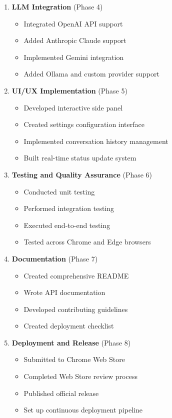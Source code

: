\documentclass[12pt,a4paper]{article}
\begin{document}
\begin{enumerate}
    \item \textbf{LLM Integration} (Phase 4)
    \begin{itemize}
        \item Integrated OpenAI API support
        \item Added Anthropic Claude support
        \item Implemented Gemini integration
        \item Added Ollama and custom provider support
    \end{itemize}
    
    \item \textbf{UI/UX Implementation} (Phase 5)
    \begin{itemize}
        \item Developed interactive side panel
        \item Created settings configuration interface
        \item Implemented conversation history management
        \item Built real-time status update system
    \end{itemize}
    
    \item \textbf{Testing and Quality Assurance} (Phase 6)
    \begin{itemize}
        \item Conducted unit testing
        \item Performed integration testing
        \item Executed end-to-end testing
        \item Tested across Chrome and Edge browsers
    \end{itemize}
    
    \item \textbf{Documentation} (Phase 7)
    \begin{itemize}
        \item Created comprehensive README
        \item Wrote API documentation
        \item Developed contributing guidelines
        \item Created deployment checklist
    \end{itemize}
    
    \item \textbf{Deployment and Release} (Phase 8)
    \begin{itemize}
        \item Submitted to Chrome Web Store
        \item Completed Web Store review process
        \item Published official release
        \item Set up continuous deployment pipeline
    \end{itemize}
    

\end{enumerate}
\end{document}
